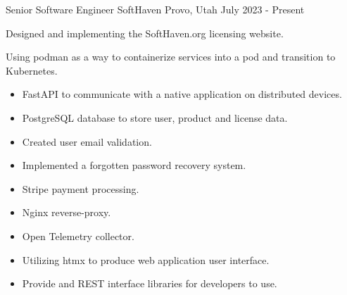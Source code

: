 
\begin{cventries}
\cventry
{Senior Software Engineer} %
{SoftHaven} %
{Provo, Utah} %
{July 2023 - Present} %
{
	\begin{cvitems} %
		\item {Designed and implementing the SoftHaven.org licensing website.}
		\item {Using podman as a way to containerize services into a pod and transition to Kubernetes.}
		\begin{itemize}
			\item {FastAPI to communicate with a native application on distributed devices.}
			\item {PostgreSQL database to store user, product and license data.}
			\item {Created user email validation.}
			\item {Implemented a forgotten password recovery system.}
			\item {Stripe payment processing.}
			\item {Nginx reverse-proxy.}
			\item {Open Telemetry collector.}
			\item {Utilizing htmx to produce web application user interface.}
			\item {Provide \Cpp and \Csh REST interface libraries for developers to use.}
		\end{itemize}
	\end{cvitems}
}



\end{cventries}
